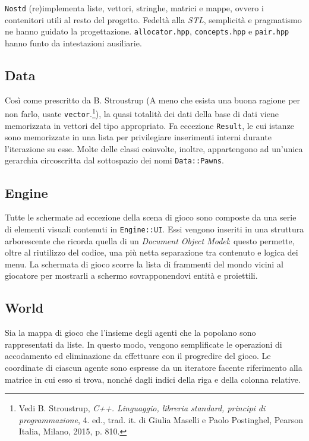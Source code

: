 \documentclass[a4paper]{article}
\begin{document}
\verb!Nostd! (re)implementa liste, vettori, stringhe, matrici e mappe, ovvero i
contenitori utili al resto del progetto. Fedelt\`a alla \emph{STL},
semplicit\`a e pragmatismo ne hanno guidato la progettazione.
\verb!allocator.hpp!, \verb!concepts.hpp! e \verb!pair.hpp! hanno funto da
intestazioni ausiliarie.

\subsection{Data}

Così come prescritto da B. Stroustrup (\guillemotleft A meno che esista una buona ragione per
non farlo, usate \verb!vector!.\guillemotright\footnote{\label{note1} Vedi B.
Stroustrup, \emph{C++. Linguaggio, libreria standard, principi di
programmazione}, 4. ed., trad. it. di Giulia Maselli e Paolo Postinghel, Pearson
Italia, Milano, 2015, p. 810.}), la quasi totalità dei dati della base di
dati viene memorizzata in vettori del tipo appropriato. Fa eccezione
\verb!Result!, le cui istanze sono memorizzate in una lista per privilegiare
inserimenti interni durante l'iterazione su esse. Molte delle classi coinvolte,
inoltre, appartengono ad un'unica gerarchia circoscritta dal sottospazio dei
nomi \verb!Data::Pawns!.

\subsection{Engine}

Tutte le schermate ad eccezione della scena di gioco sono composte da una serie
di elementi visuali contenuti in \verb!Engine::UI!. Essi vengono inseriti in una
struttura arborescente che ricorda quella di un \emph{Document Object Model}:
questo permette, oltre al riutilizzo del codice, una più netta separazione tra
contenuto e logica dei menu.
La schermata di gioco scorre la lista di frammenti del mondo vicini al giocatore
per mostrarli a schermo sovrapponendovi entit\`a e proiettili.

\subsection{World}

Sia la mappa di gioco che l'insieme degli agenti che la popolano sono
rappresentati da liste. In questo modo, vengono semplificate le operazioni di
accodamento ed eliminazione da effettuare con il progredire del gioco. Le
coordinate di ciascun agente sono espresse da un iteratore facente riferimento
alla matrice in cui esso si trova, nonch\'e dagli indici della riga e della
colonna relative.
\end{document}
